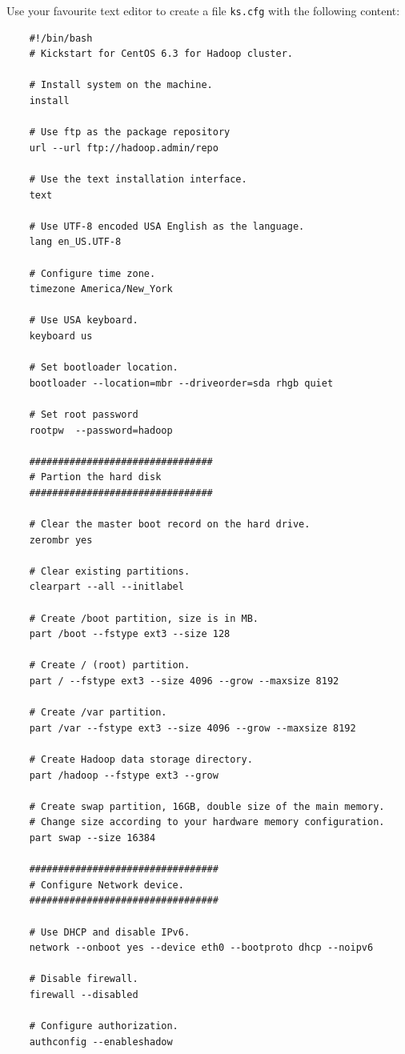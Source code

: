Use your favourite text editor to create a file \verb|ks.cfg| with the following content:
\lstset{style=bashstyle}
\begin{lstlisting}
    #!/bin/bash
    # Kickstart for CentOS 6.3 for Hadoop cluster.

    # Install system on the machine.
    install

    # Use ftp as the package repository
    url --url ftp://hadoop.admin/repo

    # Use the text installation interface.
    text

    # Use UTF-8 encoded USA English as the language.
    lang en_US.UTF-8

    # Configure time zone.
    timezone America/New_York

    # Use USA keyboard.
    keyboard us

    # Set bootloader location.
    bootloader --location=mbr --driveorder=sda rhgb quiet

    # Set root password
    rootpw  --password=hadoop

    ################################
    # Partion the hard disk
    ################################

    # Clear the master boot record on the hard drive.
    zerombr yes

    # Clear existing partitions.
    clearpart --all --initlabel

    # Create /boot partition, size is in MB.
    part /boot --fstype ext3 --size 128

    # Create / (root) partition.
    part / --fstype ext3 --size 4096 --grow --maxsize 8192

    # Create /var partition.
    part /var --fstype ext3 --size 4096 --grow --maxsize 8192

    # Create Hadoop data storage directory.
    part /hadoop --fstype ext3 --grow

    # Create swap partition, 16GB, double size of the main memory.
    # Change size according to your hardware memory configuration.
    part swap --size 16384

    #################################
    # Configure Network device.
    #################################

    # Use DHCP and disable IPv6.
    network --onboot yes --device eth0 --bootproto dhcp --noipv6

    # Disable firewall.
    firewall --disabled

    # Configure authorization.
    authconfig --enableshadow


\end{lstlisting}
